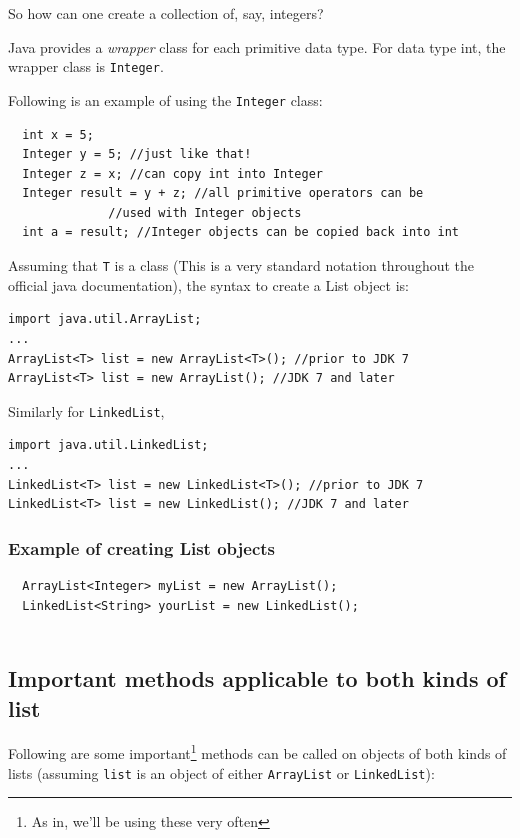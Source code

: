So how can one create a collection of, say, integers?

Java provides a \emph{wrapper} class for each primitive data type. For data type int, the wrapper class is \texttt{Integer}.

Following is an example of using the \texttt{Integer} class:

\begin{lstlisting}
  int x = 5;
  Integer y = 5; //just like that!
  Integer z = x; //can copy int into Integer
  Integer result = y + z; //all primitive operators can be
   			  //used with Integer objects
  int a = result; //Integer objects can be copied back into int
\end{lstlisting}

Assuming that \texttt{T} is a class (This is a very standard notation throughout the official java documentation), the syntax to create a List object is:

\begin{lstlisting}
import java.util.ArrayList; 
...
ArrayList<T> list = new ArrayList<T>(); //prior to JDK 7
ArrayList<T> list = new ArrayList(); //JDK 7 and later
\end{lstlisting}

Similarly for \texttt{LinkedList},

\begin{lstlisting}
import java.util.LinkedList; 
...
LinkedList<T> list = new LinkedList<T>(); //prior to JDK 7
LinkedList<T> list = new LinkedList(); //JDK 7 and later
\end{lstlisting}

\subsubsection{Example of creating List objects}

\begin{lstlisting}
  ArrayList<Integer> myList = new ArrayList();
  LinkedList<String> yourList = new LinkedList();
  
\end{lstlisting}

\subsection{Important methods applicable to both kinds of list}

Following are some important\footnote{As in, we'll be using these very often} methods can be called on objects of both kinds of lists (assuming \texttt{list} is an object of either \texttt{ArrayList} or \texttt{LinkedList}):

